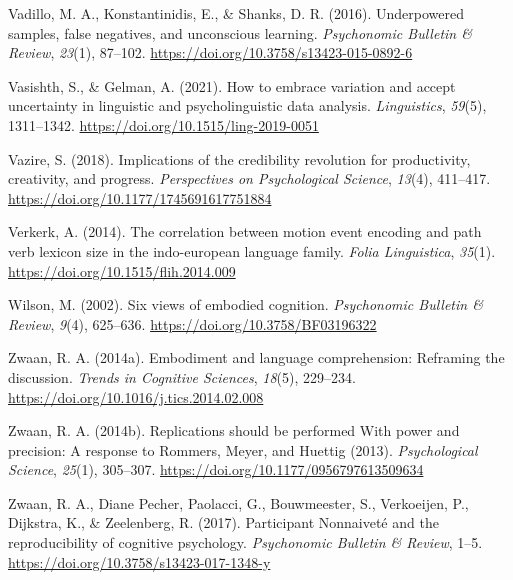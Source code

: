 \documentclass[
  man,floatsintext]{apa7}
\newlength{\cslhangindent}
\newlength{\cslentryspacingunit} %
\newenvironment{CSLReferences}[2] %
 {%
  \setlength{\parindent}{0pt}
  \ifodd #1
  \let\oldpar\par
  \def\par{\hangindent=\cslhangindent\oldpar}
  \fi
  \setlength{\parskip}{#2\cslentryspacingunit}
 }%
 {}
\begin{document}
\begin{CSLReferences}{1}{0}
\leavevmode{}%
Vadillo, M. A., Konstantinidis, E., \& Shanks, D. R. (2016). Underpowered samples, false negatives, and unconscious learning. \emph{Psychonomic Bulletin \& Review}, \emph{23}(1), 87--102. \url{https://doi.org/10.3758/s13423-015-0892-6}

\leavevmode{}%
Vasishth, S., \& Gelman, A. (2021). How to embrace variation and accept uncertainty in linguistic and psycholinguistic data analysis. \emph{Linguistics}, \emph{59}(5), 1311--1342. \url{https://doi.org/10.1515/ling-2019-0051}

\leavevmode{}%
Vazire, S. (2018). Implications of the credibility revolution for productivity, creativity, and progress. \emph{Perspectives on Psychological Science}, \emph{13}(4), 411--417. \url{https://doi.org/10.1177/1745691617751884}

\leavevmode{}%
Verkerk, A. (2014). The correlation between motion event encoding and path verb lexicon size in the indo-european language family. \emph{Folia Linguistica}, \emph{35}(1). \url{https://doi.org/10.1515/flih.2014.009}

\leavevmode{}%
Wilson, M. (2002). Six views of embodied cognition. \emph{Psychonomic Bulletin \& Review}, \emph{9}(4), 625--636. \url{https://doi.org/10.3758/BF03196322}

\leavevmode{}%
Zwaan, R. A. (2014a). Embodiment and language comprehension: Reframing the discussion. \emph{Trends in Cognitive Sciences}, \emph{18}(5), 229--234. \url{https://doi.org/10.1016/j.tics.2014.02.008}

\leavevmode{}%
Zwaan, R. A. (2014b). Replications {should be performed With power} and {precision}: {A response} to {Rommers}, {Meyer}, and {Huettig} (2013). \emph{Psychological Science}, \emph{25}(1), 305--307. \url{https://doi.org/10.1177/0956797613509634}

\leavevmode{}%
Zwaan, R. A., Diane Pecher, Paolacci, G., Bouwmeester, S., Verkoeijen, P., Dijkstra, K., \& Zeelenberg, R. (2017). Participant {Nonnaiveté} and the reproducibility of cognitive psychology. \emph{Psychonomic Bulletin \& Review}, 1--5. \url{https://doi.org/10.3758/s13423-017-1348-y}


\end{CSLReferences}
\end{document}
